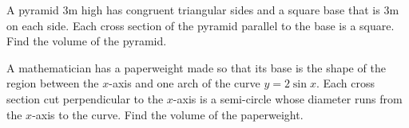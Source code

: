 \begin{questions}
    \question A pyramid 3m high has congruent triangular sides and a square base that is 3m on each side. Each cross section of the pyramid parallel to the base is a square. Find the volume of the pyramid.
    
    
    \question A mathematician has a paperweight made so that its base is the shape of the region between the $x$-axis and one arch of the curve $y=2\sin x$. Each cross section cut perpendicular to the $x$-axis is a semi-circle whose diameter runs from the $x$-axis to the curve. Find the volume of the paperweight.
\end{questions}



\newpage
